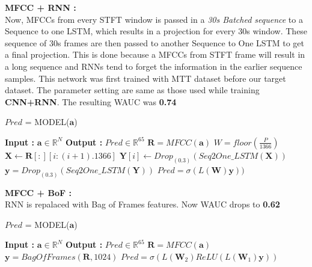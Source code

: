 \noindent \textbf{MFCC + RNN :}\\
Now, MFCCs from every STFT window is passed in a \textit{30s  Batched sequence} to a Sequence to one LSTM, which results in a projection for every 30s window. These sequence of 30s frames are then passed to another Sequence to One LSTM to get a final projection. This is done because a MFCCs from STFT frame will result in a long sequence and RNNs tend to forget the information in the earlier sequence samples. This network was first trained with MTT dataset before our target dataset. The parameter setting are same as those used while training \textbf{CNN+RNN}. The resulting WAUC was \textbf{0.74}   
\begin{algorithm}
  \caption{$Pred$ = MODEL($\textbf{a}$) }\label{alg:mfccrnn}
  \begin{algorithmic}[1]
    \Statex \textbf{Input :} $\textbf{a} \in \mathbb{R}^{N}$
    \Statex \textbf{Output :} $Pred \in \mathbb{R}^{65}$ 
    \State $\textbf{R} = MFCC(\textbf{a})$ 
        \State $W = floor(\frac{P}{1366})$
      \State $\textbf{X} \leftarrow \textbf{R}[:][i:(i+1).1366]$ 
    \State $\textbf{Y}[i] \leftarrow Drop_{(0.3)}(Seq2One\_LSTM(\textbf{X}))$ 
    \EndFor
    \State $\textbf{y} = Drop_{(0.3)}(Seq2One\_LSTM(\textbf{Y}))$ 
    \State $Pred = \sigma(L(\textbf{W})\textbf{y}))$ 
  \end{algorithmic}
\end{algorithm}
\FloatBarrier

\noindent \textbf{MFCC + BoF :}\\
RNN is repalaced with Bag of Frames features. Now WAUC drops to \textbf{0.62}
\begin{algorithm}
  \caption{$Pred$ = MODEL($\textbf{a}$) }\label{alg:mfccbow}
  \begin{algorithmic}[1]
    \Statex \textbf{Input :} $\textbf{a} \in \mathbb{R}^{N}$
    \Statex \textbf{Output :} $Pred \in \mathbb{R}^{65}$ 
    \State $\textbf{R} = MFCC(\textbf{a})$ 
   \State $\textbf{y} = BagOfFrames(\textbf{R},1024)$ 
     \State $Pred = \sigma(L(\textbf{W}_{2})ReLU(L(\textbf{W}_{1})\textbf{y}))$ 
  \end{algorithmic}
\end{algorithm}
\FloatBarrier    

